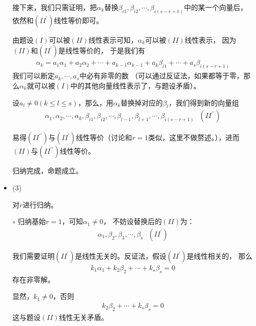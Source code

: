 \documentclass{article}
\begin{document}
\begin{itemize}
        接下来，我们只需证明，把$\alpha_k$替换$\beta_{i1}, \beta_{i2}, \cdots, \beta_{i(s - r + 1)}$中的某一个向量后，
        依然和$(II^\prime)$线性等价即可。

        由题设$(I)$可以被$(II)$线性表示可知，$\alpha_k$可以被$(II)$线性表示，
        因为$(II)$和$(II^\prime)$是线性等价的，
        于是我们有
        \begin{align*}
          \alpha_k = a_1 \alpha_1 + a_2 \alpha_2 + \cdots + a_{k - 1} \alpha_{k - 1} + a_k \beta_{i1} + \cdots + a_s \beta_{i(s - r + 1)}
        \end{align*}
        我们可以断定$a_k, \cdots, a_s$中必有非零的数
        （可以通过反证法，如果都等于零，那么$\alpha_k$就可以被$(I)$中的其他向量线性表示了，与题设矛盾）。

        设$a_{l} \neq 0 (k \leq l \leq s)$，那么，用$\alpha_k$替换掉对应的$\beta_{l}$，我们得到新的向量组
        \begin{align*}
          \alpha_1, \alpha_2, \cdots, \alpha_{k}, \beta_{i1}, \beta_{i2}, \cdots,
          \beta_{l - 1}, \beta_{l + 1}, \cdots, \beta_{i(s - r + 1)} \ \ \ (II^{\prime\prime})
        \end{align*}

        易得$(II^{\prime\prime})$与$(II^\prime)$线性等价（讨论和$r = 1$类似，这里不做赘述。），进而$(II)$与$(II^{\prime\prime})$线性等价。

        归纳完成，命题成立。

  \item (3)

        对$r$进行归纳。

        $\circ$ 归纳基始$r = 1$，可知$\alpha_1 \neq 0$，
        不妨设替换后的$(II)$为：
        \begin{align*}
          \alpha_1, \beta_2, \beta_3, \cdots, \beta_s \ \ \ (II^\prime)
        \end{align*}

        我们需要证明$(II^\prime)$是线性无关的。反证法，假设$(II^\prime)$是线性相关的，
        那么
        \begin{align*}
          k_1 \alpha_1 + k_2 \beta_2 + \cdots + k_s \beta_s = 0
        \end{align*}
        存在非零解。

        显然，$k_1 \neq 0$，否则
        \begin{align*}
          k_2 \beta_2 + \cdots + k_s \beta_s = 0
        \end{align*}
        这与题设$(II)$线性无关矛盾。


\end{itemize}
\end{document}
